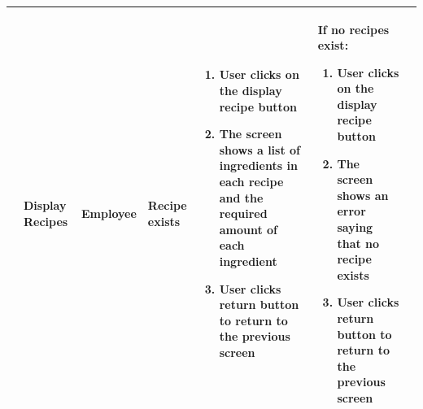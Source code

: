 \begin{landscape}
\begin{longtable}{|p{}|p{}|p{}|p{}|p{}|p{}|p{}|}
	 \rownumber & Display Recipes & Employee & Recipe exists & 
\begin{enumerate}[wide, labelwidth=!, labelindent=0pt, nosep, topsep=0pt, parsep=0pt]
	\item User clicks on the display recipe button
	\item The screen shows a list of ingredients in each recipe and the required amount of each ingredient
	\item User clicks return button to return to the previous screen
\end{enumerate} & If no recipes exist:\begin{enumerate}[wide, labelwidth=!, labelindent=0pt, nosep, topsep=0pt, parsep=0pt]
	\item User clicks on the display recipe button
	\item The screen shows an error saying that no recipe exists
	\item User clicks return button to return to the previous screen
\end{enumerate} & \\\hline
\end{longtable}
\end{landscape}
\clearpage%

